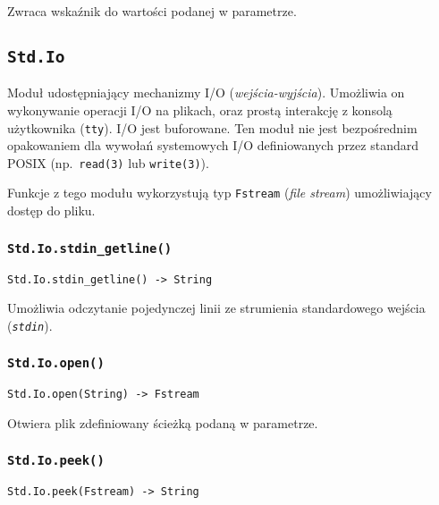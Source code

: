 Zwraca wskaźnik do wartości podanej w parametrze.

\subsection{\texttt{Std.Io}}
\label{stdlib_Std_Io}

Moduł udostępniający mechanizmy I/O (\emph{wejścia-wyjścia}). Umożliwia on
wykonywanie operacji I/O na plikach, oraz prostą interakcję z konsolą
użytkownika (\texttt{tty}). I/O jest buforowane. Ten moduł nie jest bezpośrednim
opakowaniem dla wywołań systemowych I/O definiowanych przez standard POSIX
(np.~\texttt{read(3)} lub \texttt{write(3)}).

Funkcje z tego modułu wykorzystują typ \texttt{Fstream} (\emph{file stream})
umożliwiający dostęp do pliku.

\subsubsection{\texttt{Std.Io.stdin\_getline()}}

\begin{small}
\begin{lstlisting}
Std.Io.stdin_getline() -> String
\end{lstlisting}
\end{small}

Umożliwia odczytanie pojedynczej linii ze strumienia standardowego wejścia (\emph{\texttt{stdin}}).

\subsubsection{\texttt{Std.Io.open()}}

\begin{small}
\begin{lstlisting}
Std.Io.open(String) -> Fstream
\end{lstlisting}
\end{small}

Otwiera plik zdefiniowany ścieżką podaną w parametrze.

\subsubsection{\texttt{Std.Io.peek()}}

\begin{small}
\begin{lstlisting}
Std.Io.peek(Fstream) -> String
\end{lstlisting}
\end{small}

